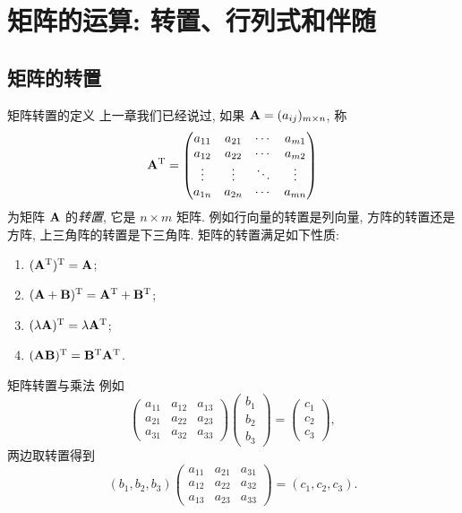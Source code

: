 \section{矩阵的运算: 转置、行列式和伴随}

\subsection{矩阵的转置}

\begin{frame}{矩阵转置的定义}
	\onslide<+->
	上一章我们已经说过, 如果 ${\mathbf{A}}=(a_{ij})_{m\times n}$, 称
	\[{\mathbf{A}}^{\mathrm{T}}=\begin{pmatrix}
		a_{11}&a_{21}&\cdots&a_{m1}\\
		a_{12}&a_{22}&\cdots&a_{m2}\\
		\vdots&\vdots&\ddots&\vdots\\
		a_{1n}&a_{2n}&\cdots&a_{mn}
	\end{pmatrix}\]
	为矩阵 ${\mathbf{A}}$ 的\emph{转置}, 它是 $n\times m$ 矩阵.
	\onslide<+->
	例如行向量的转置是列向量, 方阵的转置还是方阵, 上三角阵的转置是下三角阵.
	\onslide<+->
	矩阵的转置满足如下性质:
	\begin{enumerate}
		\item $({\mathbf{A}}^{\mathrm{T}})^{\mathrm{T}}={\mathbf{A}}$;
		\item $({\mathbf{A}}+{\mathbf{B}})^{\mathrm{T}}={\mathbf{A}}^{\mathrm{T}}+{\mathbf{B}}^{\mathrm{T}}$;
		\item $(\lambda{\mathbf{A}})^{\mathrm{T}}=\lambda{\mathbf{A}}^{\mathrm{T}}$;
		\item \alert{$({\mathbf{A}}{\mathbf{B}})^{\mathrm{T}}={\mathbf{B}}^{\mathrm{T}}{\mathbf{A}}^{\mathrm{T}}$}.
	\end{enumerate}
\end{frame}


\begin{frame}{矩阵转置与乘法}
	\onslide<+->
	例如
	\[\begin{pmatrix}
		a_{11}&a_{12}&a_{13}\\
		a_{21}&a_{22}&a_{23}\\
		a_{31}&a_{32}&a_{33}
	\end{pmatrix}\begin{pmatrix}
		b_1\\b_2\\b_3
	\end{pmatrix}=\begin{pmatrix}
		c_1\\c_2\\c_3
	\end{pmatrix},\]
	\onslide<+->
	两边取转置得到
	\[(b_1,b_2,b_3)\begin{pmatrix}
		a_{11}&a_{21}&a_{31}\\
		a_{12}&a_{22}&a_{32}\\
		a_{13}&a_{23}&a_{33}
	\end{pmatrix}=(c_1,c_2,c_3).\]
\end{frame}


